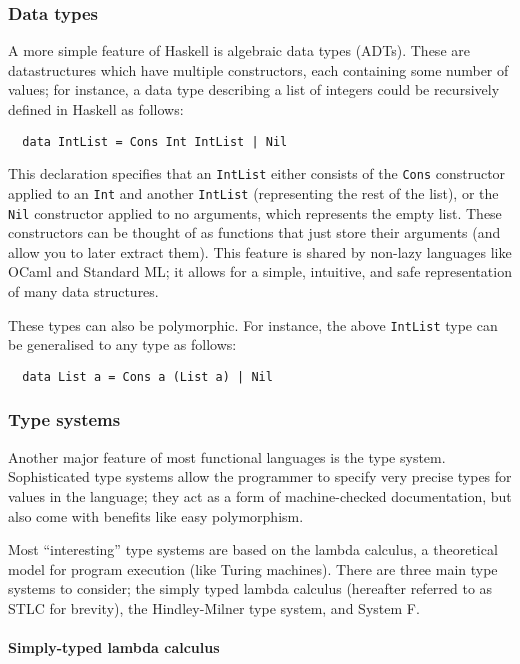 \documentclass[9pt]{extarticle}
\begin{document}
\subsubsection{Data types}

A more simple feature of Haskell is algebraic data types (ADTs). These are
datastructures which have multiple constructors, each containing some number of
values; for instance, a data type describing a list of integers could be
recursively defined in Haskell as follows:

\begin{verbatim}
  data IntList = Cons Int IntList | Nil
\end{verbatim}

This declaration specifies that an \verb'IntList' either consists of the
\verb'Cons' constructor applied to an \verb'Int' and another
\verb'IntList' (representing the rest of the list), or the \verb'Nil'
constructor applied to no arguments, which represents the empty list.
These constructors can be thought of as functions that just store their
arguments (and allow you to later extract them). This feature is shared
by non-lazy languages like OCaml and Standard ML; it allows for a
simple, intuitive, and safe representation of many data structures.

These types can also be polymorphic. For instance, the above
\verb'IntList' type can be generalised to any type as follows:

\begin{verbatim}
  data List a = Cons a (List a) | Nil
\end{verbatim}

\subsubsection{Type systems}

Another major feature of most functional languages is the type system.
Sophisticated type systems allow the programmer to specify very precise types
for values in the language; they act as a form of machine-checked documentation,
but also come with benefits like easy polymorphism.

Most ``interesting'' type systems are based on the lambda calculus, a theoretical
model for program execution (like Turing machines). There are three main type
systems to consider; the simply typed lambda calculus (hereafter referred to as
STLC for brevity), the Hindley-Milner type system, and System F.

\paragraph{Simply-typed lambda calculus}
\end{document}
